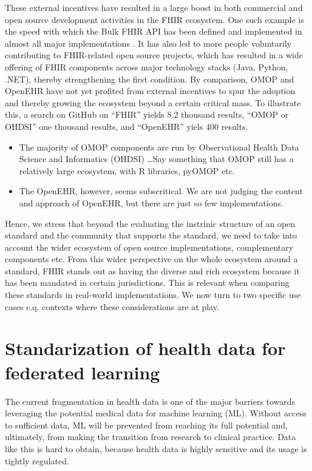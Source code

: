 \documentclass[
  authoryear]{elsarticle}
\providecommand{\tightlist}{%
  \setlength{\itemsep}{0pt}\setlength{\parskip}{0pt}}\usepackage{longtable,booktabs,array}
\begin{document}
These external incentives have resulted in a large boost in both
commercial and open source development activities in the FHIR ecosystem.
One such example is the speed with which the Bulk FHIR API has been
defined and implemented in almost all major implementations
\citep{mandl2020push, jones2021landscape}. It has also led to more
people voluntarily contributing to FHIR-related open source projects,
which has resulted in a wide offering of FHIR components across major
technology stacks (Java, Python, .NET), thereby strengthening the first
condition. By comparison, OMOP and OpenEHR have not yet profited from
external incentives to spur the adoption and thereby growing the
ecosystem beyond a certain critical mass. To illustrate this, a search
on GitHub on ``FHIR'' yields 8.2 thousand results, ``OMOP or OHDSI'' one
thousand results, and ``OpenEHR'' yiels 400 results.

\begin{itemize}
\tightlist
\item
  The majority of OMOP components are run by Observational Health Data
  Science and Informatics (OHDSI) \ldots Say something that OMOP still
  has a relatively large ecosystem, with R libraries, pyOMOP etc.
\item
  The OpenEHR, however, seems subscritical. We are not judging the
  content and approach of OpenEHR, but there are just so few
  implementations.
\end{itemize}

Hence, we stress that beyond the evaluating the instrinic structure of
an open standard and the community that supports the standard, we need
to take into account the wider ecosystem of open source implementations,
complementary components etc. From this wider perspective on the whole
ecosystem around a standard, FHIR stands out as having the diverse and
rich ecosystem because it has been mandated in certain jurisdictions.
This is relevant when comparing these standards in real-world
implementations. We now turn to two specific use cases c.q. contexts
where these considerations are at play.

\section{Standarization of health data for federated
learning}\label{standarization-of-health-data-for-federated-learning}

The current fragmentation in health data is one of the major barriers
towards leveraging the potential medical data for machine learning (ML).
Without access to sufficient data, ML will be prevented from reaching
its full potential and, ultimately, from making the transition from
research to clinical practice. Data like this is hard to obtain, because
health data is highly sensitive and its usage is tightly regulated.
\end{document}
